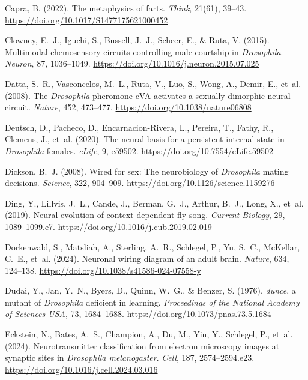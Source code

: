 Capra, B. (2022). The metaphysics of farts. \emph{Think}, 21(61), 39--43. \url{https://doi.org/10.1017/S1477175621000452}

Clowney, E.~J., Iguchi, S., Bussell, J.~J., Scheer, E., \& Ruta, V. (2015). Multimodal chemosensory circuits controlling male courtship in \emph{Drosophila}. \emph{Neuron}, 87, 1036--1049. \url{https://doi.org/10.1016/j.neuron.2015.07.025}

Datta, S.~R., Vasconcelos, M.~L., Ruta, V., Luo, S., Wong, A., Demir, E., et~al. (2008). The \emph{Drosophila} pheromone cVA activates a sexually dimorphic neural circuit. \emph{Nature}, 452, 473--477. \url{https://doi.org/10.1038/nature06808}

Deutsch, D., Pacheco, D., Encarnacion-Rivera, L., Pereira, T., Fathy, R., Clemens, J., et~al. (2020). The neural basis for a persistent internal state in \emph{Drosophila} females. \emph{eLife}, 9, e59502. \url{https://doi.org/10.7554/eLife.59502}

Dickson, B.~J. (2008). Wired for sex: The neurobiology of \emph{Drosophila} mating decisions. \emph{Science}, 322, 904--909. \url{https://doi.org/10.1126/science.1159276}

Ding, Y., Lillvis, J.~L., Cande, J., Berman, G.~J., Arthur, B.~J., Long, X., et~al. (2019). Neural evolution of context-dependent fly song. \emph{Current Biology}, 29, 1089--1099.e7. \url{https://doi.org/10.1016/j.cub.2019.02.019}

Dorkenwald, S., Matsliah, A., Sterling, A.~R., Schlegel, P., Yu, S.~C., McKellar, C.~E., et~al. (2024). Neuronal wiring diagram of an adult brain. \emph{Nature}, 634, 124--138. \url{https://doi.org/10.1038/s41586-024-07558-y}

Dudai, Y., Jan, Y.~N., Byers, D., Quinn, W.~G., \& Benzer, S. (1976). \emph{dunce}, a mutant of \emph{Drosophila} deficient in learning. \emph{Proceedings of the National Academy of Sciences USA}, 73, 1684--1688. \url{https://doi.org/10.1073/pnas.73.5.1684}

Eckstein, N., Bates, A.~S., Champion, A., Du, M., Yin, Y., Schlegel, P., et~al. (2024). Neurotransmitter classification from electron microscopy images at synaptic sites in \emph{Drosophila melanogaster}. \emph{Cell}, 187, 2574--2594.e23. \url{https://doi.org/10.1016/j.cell.2024.03.016}

